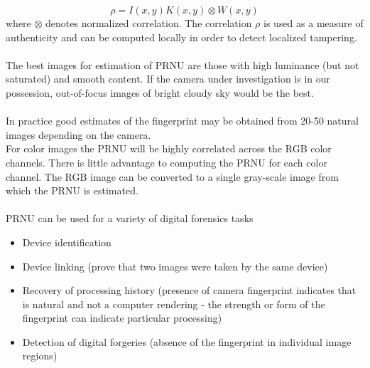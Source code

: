 \documentclass[10pt,a4paper]{book}
\begin{document}
$$\rho = I(x,y)K(x,y) \otimes W(x,y) $$
where $\otimes$ denotes normalized correlation. The correlation $\rho$ is used as a measure of authenticity and can be computed locally in order to detect localized tampering.\\\\
The best images for estimation of PRNU are those with high luminance (but not saturated) and smooth content. If the camera under investigation is in our possession, out-of-focus images of bright cloudy sky would be the best.\\\\
In practice good estimates of the fingerprint may be obtained from 20-50 natural images depending on the camera. \\
For color images the PRNU will be highly correlated across the RGB color channels. There is little advantage to computing the PRNU for each color channel. The RGB image can be converted to a single gray-scale image from which the PRNU is estimated.\\\\
PRNU can be used for a variety of digital forensics tasks
\begin{itemize}
\item  Device identification
\item Device linking (prove that two images were taken by the same device)
\item  Recovery of processing history (presence of camera fingerprint indicates that is natural and not a computer rendering - the strength
or form of the fingerprint can indicate particular processing)
\item  Detection of digital forgeries (absence of the fingerprint in individual
image regions)
\end{itemize}
\end{document}

